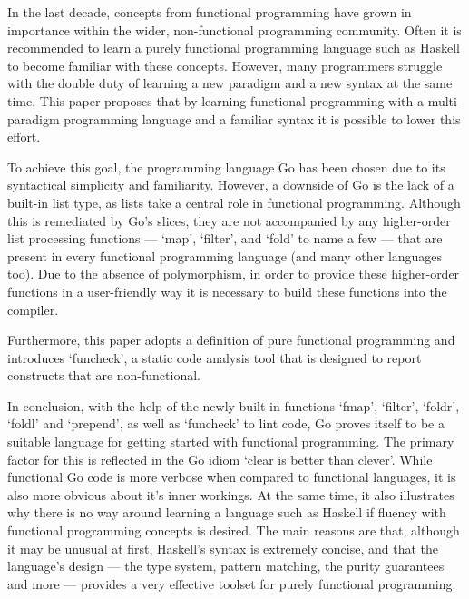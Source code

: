
In the last decade, concepts from functional programming have grown in
importance within the wider, non-functional programming community.
Often it is recommended to learn a purely functional programming language
such as Haskell to become familiar with these concepts.
However, many programmers struggle with the double duty
of learning a new paradigm and a new syntax at the same time.
This paper proposes that by learning functional programming with a
multi-paradigm programming language and a familiar syntax it is possible
to lower this effort.

To achieve this goal, the programming language Go has been chosen due to
its syntactical simplicity and familiarity.
However, a downside of Go is the lack of a built-in list type, as lists take a
central role in functional programming. Although this is remediated by Go's slices,
they are not accompanied by any higher-order list processing functions --- `map', `filter', and `fold' to name a
few --- that are present in every functional programming language (and many
other languages too).
Due to the absence of polymorphism, in order to provide these higher-order functions in
a user-friendly way it is necessary to build these functions into the compiler.

Furthermore, this paper adopts a definition of pure functional programming and
introduces `funcheck', a static code analysis tool that is designed to
report constructs that are non-functional.

In conclusion, with the help of the newly built-in functions `fmap', `filter', `foldr', `foldl' and
`prepend', as well as `funcheck' to lint code, Go proves itself to be a
suitable language for getting started with functional programming.
The primary factor for this is reflected in the Go idiom `clear is better than clever'.
While functional Go code is more verbose when compared to functional languages, it
is also more obvious about it's inner workings.
At the same time, it also illustrates why there is no way around learning a
language such as Haskell if fluency with functional programming concepts
is desired. The main reasons are that, although it may be unusual at first, Haskell's
syntax is extremely concise, and that the language's design --- the type system,
pattern matching, the purity guarantees and more --- provides a very effective toolset
for purely functional programming.
